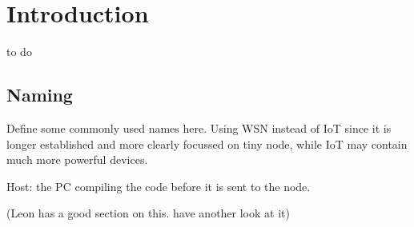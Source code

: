 \chapter{Introduction}
to do

\section{Naming}

Define some commonly used names here. Using WSN instead of IoT since it is longer established and more clearly focussed on tiny node, while IoT may contain much more powerful devices.

Host: the PC compiling the code before it is sent to the node.

(Leon has a good section on this. have another look at it)